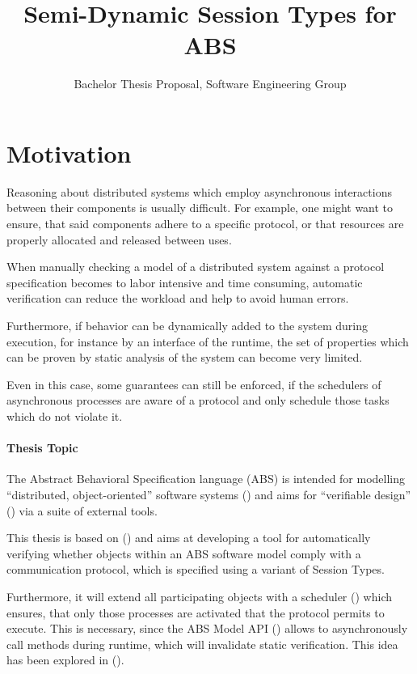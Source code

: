 \documentclass[paper=a4,nochapname,accentcolor=tud9c]{tudexercise}
\title{Semi-Dynamic Session Types for ABS}
\subtitle{Bachelor Thesis Proposal, Software Engineering Group}
\newcommand\textcitep[1]{\mkbibparens{\textcite{#1}}}
\newcommand\textcitesp[1]{\mkbibparens{\textcites{#1}}}
\begin{document}
%
\maketitle
%
\tableofcontents

\section{Motivation}
Reasoning about distributed systems which employ asynchronous interactions between their
components is usually difficult. %
For example, one might want to ensure, that said components adhere to a specific
protocol, or that resources are properly allocated and released between uses.

When manually checking a model of a distributed system against a protocol
specification becomes to labor intensive and time consuming, automatic verification
can reduce the workload and help to avoid human errors.

Furthermore, if behavior can be dynamically added to the system during execution,
for instance by an interface of the runtime, the set of properties which
can be proven by static analysis of the system can become very limited.

Even in this case, some guarantees can still be enforced, if the schedulers of
asynchronous processes are aware of a protocol and only schedule those tasks
which do not violate it.

\paragraph{Thesis Topic}

The Abstract Behavioral Specification language (ABS) is intended for modelling
``distributed, object-oriented'' software systems \textcitep{johnsen2010abs} and
aims for ``verifiable design'' \textcitep{hahnle2012abstract} via a suite of external tools.

This thesis is based on %
\textcitesp{kamburjan2018stateful, kamburjan2016session} and
aims at developing a tool for automatically verifying whether objects within an
ABS software model comply with a communication protocol, which is specified
using a variant of Session Types. %

Furthermore, it will extend all participating objects with a scheduler \textcitep{bjork2013user} which
ensures, that only those processes are activated that the protocol permits to execute.
This is necessary, since the ABS Model API \textcitep{schlatte2018release} allows to asynchronously call methods during
runtime, which will invalidate static verification.
This idea has been explored in \textcitep{kamburjan2016session}.
\end{document}

